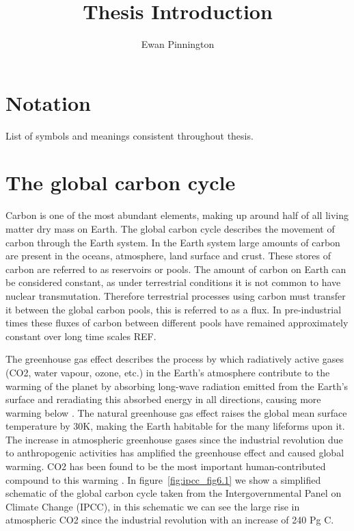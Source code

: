 \documentclass[11pt]{article}
\title{Thesis Introduction}
\author{Ewan Pinnington}
\begin{document}
\maketitle

\section{Notation}
List of symbols and meanings consistent throughout thesis.

\section{The global carbon cycle}

Carbon is one of the most abundant elements, making up around half of all living matter dry mass on Earth. The global carbon cycle describes the movement of carbon through the Earth system. In the Earth system large amounts of carbon are present in the oceans, atmosphere, land surface and crust. These stores of carbon are referred to as reservoirs or pools. The amount of carbon on Earth can be considered constant, as under terrestrial conditions it is not common to have nuclear transmutation. Therefore terrestrial processes using carbon must transfer it between the global carbon pools, this is referred to as a flux. In pre-industrial times these fluxes of carbon between different pools have remained approximately constant over long time scales REF.

The greenhouse gas effect describes the process by which radiatively active gases (CO2, water vapour, ozone, etc.) in the Earth's atmosphere contribute to the warming of the planet by absorbing long-wave radiation emitted from the Earth's surface and reradiating this absorbed energy in all directions, causing more warming below \citep{mitchell1989greenhouse}. The natural greenhouse gas effect raises the global mean surface temperature by 30K, making the Earth habitable for the many lifeforms upon it. The increase in atmospheric greenhouse gases since the industrial revolution due to anthropogenic activities has amplified the greenhouse effect and caused global warming. CO2 has been found to be the most important human-contributed compound to this warming \citep{Falkowski291}. In figure~\ref{fig:ipcc_fig6.1} we show a simplified schematic of the global carbon cycle taken from the Intergovernmental Panel on Climate Change (IPCC), in this schematic we can see the large rise in atmospheric CO2 since the industrial revolution with an increase of 240 Pg C.
\end{document}
